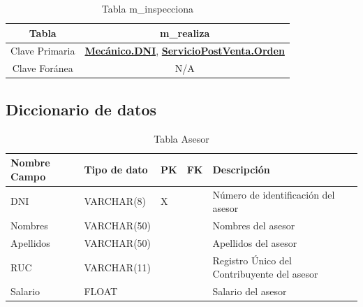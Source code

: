 \documentclass[12pt]{article}
\begin{document}
\begin{table}[htbp]
\begin{center}
\begin{tabular}{|c|c|}
\hline
Tabla & m\_realiza \\
\hline
Clave Primaria & \textbf{\underline{Mecánico.DNI}}, \textbf{\underline{ServicioPostVenta.Orden}} \\
\hline
Clave Foránea & N/A \\
\hline
\end{tabular}
\caption{Tabla m\_inspecciona}
\label{tab:tablas}
\end{center}
\end{table}

\subsection{Diccionario de datos}

\begin{table}[htbp]
    \begin{center}
    \begin{tabular}{|l|l|l|l|l|}
        \hline
        Nombre Campo & Tipo de dato & PK & FK & Descripción \\
        \hline
        DNI & VARCHAR(8) & X &  & Número de identificación del asesor \\
        Nombres & VARCHAR(50) &  &  & Nombres del asesor \\
        Apellidos & VARCHAR(50) &  &  & Apellidos del asesor \\
        RUC & VARCHAR(11) &  &  & Registro Único del Contribuyente del asesor \\
        Salario & FLOAT &  &  & Salario del asesor \\
        \hline
        \end{tabular}
        \caption{Tabla Asesor}
        \label{tab:tablas}
    \end{center}
\end{table}
\end{document}
